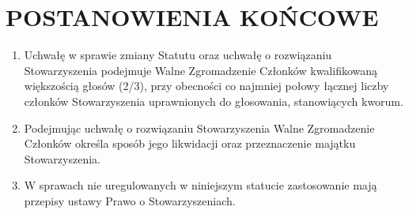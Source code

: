 \documentclass{article}
\begin{document}
\section{POSTANOWIENIA KOŃCOWE}
  \begin{enumerate}
    \item Uchwałę w sprawie zmiany Statutu oraz uchwałę o rozwiązaniu Stowarzyszenia podejmuje Walne Zgromadzenie Członków kwalifikowaną większością głosów (2/3), przy obecności co najmniej połowy łącznej liczby członków Stowarzyszenia uprawnionych do głosowania, stanowiących kworum.
    \item Podejmując uchwałę o rozwiązaniu Stowarzyszenia Walne Zgromadzenie Członków określa sposób jego likwidacji oraz przeznaczenie majątku Stowarzyszenia.
    \item W sprawach nie uregulowanych w niniejszym statucie zastosowanie mają przepisy ustawy Prawo o Stowarzyszeniach.
  \end{enumerate}
\end{document}
